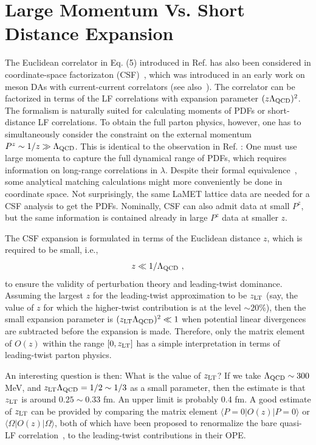 \section{Large Momentum Vs. Short Distance Expansion}

The Euclidean correlator in Eq. (5) introduced in Ref. \cite{Ji:2013dva}
has also been considered in coordinate-space factorizaton (CSF)~\cite{Radyushkin:2017cyf}, which was
introduced in an early work on meson DAs with current-current correlators
\cite{Braun:2007wv} (see also~\cite{Ma:2017pxb}).
The correlator can be factorized in terms of the LF correlations
with expansion parameter $(z\Lambda_{\rm QCD})^2$. The formalism is
naturally suited for calculating moments of PDFs or short-distance
LF correlations. To obtain the full parton physics, however, one has to
simultaneously consider the constraint on the external momentum $P^z\sim 1/z \gg \Lambda_{\rm QCD}$.
This is identical to the observation in Ref. \cite{Ji:2014gla}: One must use
large momenta to capture the full dynamical range of PDFs, which requires information on
long-range correlations in $\lambda$.
Despite their formal equivalence~\cite{Ji:2017rah,Izubuchi:2018srq,Radyushkin:2017lvu},
some analytical matching calculations might
more conveniently be done in coordinate space. Not surprisingly, the same LaMET
lattice data are needed for a CSF analysis to get the PDFs.
Nominally, CSF can also admit data at small $P^z$, but the same information is
contained already in large $P^z$ data at smaller $z$.

The CSF expansion is formulated in terms of
the Euclidean distance $z$, which is required to be small, i.e.,
\begin{equation}
         z\ll 1/\Lambda_{\rm QCD}\ ,
\end{equation}
to ensure the validity of perturbation theory and leading-twist dominance.
Assuming the largest $z$ for the leading-twist
approximation to be $z_{\rm LT}$ (say, the value of $z$ for which the higher-twist contribution
is at the level $\sim20\%$), then the small
expansion parameter is $(z_{\rm LT}\Lambda_{\rm QCD})^2\ll 1 $ when
potential linear divergences are subtracted
before the expansion is made. Therefore, only the matrix element
of $O(z)$ within the range $[0, z_{\rm LT}]$ has a simple interpretation
in terms of leading-twist parton physics.

An interesting question is then: What is the value of $z_{\rm LT}$?
If we take $\Lambda_{\rm QCD}\sim 300$ MeV, and  $z_{\rm LT}\Lambda_{\rm QCD}=1/2\sim 1/3$ as
a small parameter, then the estimate is that $z_{\rm LT}$ is around $0.25 \sim 0.33$ fm. An
upper limit is probably 0.4 fm. A good estimate of $z_{\rm LT}$ can be provided by comparing the matrix element $\langle P=0| O(z)|P=0\rangle$ or $\langle \Omega| O(z)|\Omega\rangle$, both of which have been proposed to renormalize the bare quasi-LF correlation~\cite{Radyushkin:2017cyf,Braun:2018brg,Li:2020xml}, to the leading-twist contributions in their OPE.

